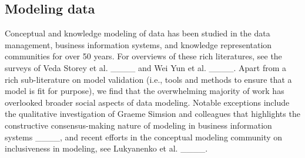 \subsection{Modeling data}

Conceptual and knowledge modeling of data has been studied in the data management, business information systems, and knowledge representation communities for over 50 years.  For overviews of these rich literatures, see the surveys of Veda Storey et al. ____ and Wei Yun et al. ____.  Apart from a rich sub-literature on model validation (i.e., tools and methods to ensure that a model is fit for purpose), we find that the overwhelming majority of work has overlooked broader social aspects of data modeling.   Notable exceptions include the qualitative investigation of Graeme Simsion and colleagues that highlights the constructive consensus-making nature of modeling in business information systems ____, and recent efforts in the conceptual modeling community on inclusiveness in modeling, see  Lukyanenko et al. ____.